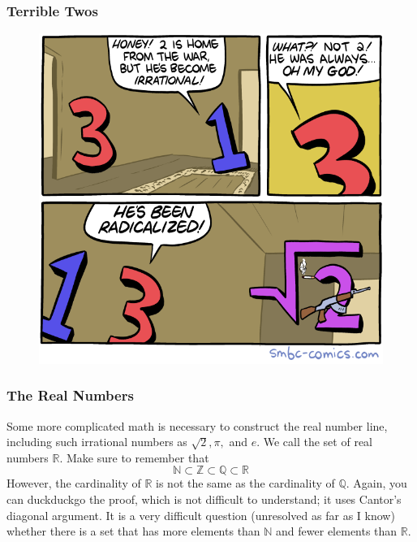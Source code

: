 \documentclass[xcolor=dvipsnames]{beamer}
\begin{document}
\begin{frame}
  \frametitle{Terrible Twos}
  \begin{figure}[h]
    \includegraphics[scale=0.35]{./radicalized.png}
  \end{figure}
\end{frame}

\begin{frame}
  \frametitle{The Real Numbers}
Some more complicated math is necessary to construct the real number
line, including such irrational numbers as $\sqrt{2},\pi,$ and $e$. We
call the set of real numbers $\mathbb{R}$. Make sure to remember that
\begin{equation}
  \label{eq:ainieroo}
  \mathbb{N}\subset\mathbb{Z}\subset\mathbb{Q}\subset\mathbb{R}
\end{equation}
However, the cardinality of $\mathbb{R}$ is not the same as the
cardinality of $\mathbb{Q}$. Again, you can duckduckgo the proof, which is
not difficult to understand; it uses Cantor's diagonal argument. It is
a very difficult question (unresolved as far as I know) whether there
is a set that has more elements than $\mathbb{N}$ and fewer elements
than $\mathbb{R}$.
\end{frame}
\end{document}
